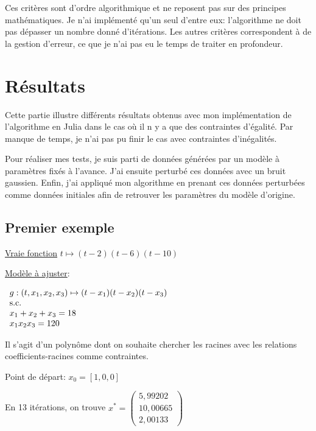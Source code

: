 \documentclass[a4paper,11pt]{article}
\numberwithin{equation}{section}
\begin{document}
Ces critères sont d'ordre algorithmique et ne reposent pas sur des principes mathématiques. Je n'ai implémenté qu'un seul d'entre eux: l'algorithme ne doit pas dépasser un nombre donné d'itérations. Les autres critères correspondent à de la gestion d'erreur, ce que je n'ai pas eu le temps de traiter en profondeur.


\section{Résultats}

Cette partie illustre différents résultats obtenus avec mon implémentation de l'algorithme en Julia dans le cas où il n y a que des contraintes d'égalité. Par manque de temps, je n'ai pas pu finir le cas avec contraintes d'inégalités. 

Pour réaliser mes tests, je suis parti de données générées par un modèle à paramètres fixés à l'avance. J'ai ensuite perturbé ces données avec un bruit gaussien. Enfin, j'ai appliqué mon algorithme en prenant ces données perturbées comme données initiales afin de retrouver les paramètres du modèle d'origine. 

\subsection{Premier exemple}

\underline{Vraie fonction} $t\mapsto (t-2)(t-6)(t-10)$
\newline

\underline{Modèle à ajuster}:

$
\begin{array}{l l l l}
g:(t, x_1, x_2, x_3) \mapsto (t-x_1)(t-x_2)(t-x_3)\\
\text{s.c.}\\
x_1+x_2+x_3 = 18 \\
x_1  x_2  x_3 = 120
\end{array}
$

Il s'agit d'un polynôme dont on souhaite chercher les racines avec les relations coefficients-racines comme contraintes.

Point de départ:
$x_{0} = [1, 0, 0]$

En 13 itérations, on trouve 
 $x^{*} = \begin{pmatrix}
5,99202\\
10,00665\\
2,00133
\end{pmatrix}$

\newpage
\end{document}
